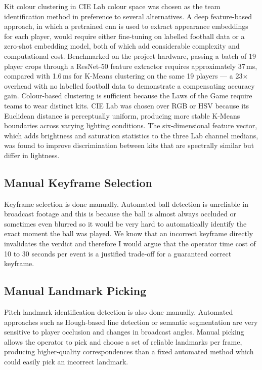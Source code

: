 Kit colour clustering in CIE Lab colour space was chosen as the team identification method in preference to several alternatives. A deep feature-based approach, in which a pretrained \gls{cnn} is used to extract appearance embeddings for each player, would require either fine-tuning on labelled football data or a zero-shot embedding model, both of which add considerable complexity and computational cost. Benchmarked on the project hardware, passing a batch of 19 player crops through a ResNet-50 feature extractor requires approximately 37\,ms, compared with 1.6\,ms for K-Means clustering on the same 19 players — a 23$\times$ overhead with no labelled football data to demonstrate a compensating accuracy gain. Colour-based clustering is sufficient because the Laws of the Game require teams to wear distinct kits. CIE Lab was chosen over RGB or HSV because its Euclidean distance is perceptually uniform, producing more stable K-Means boundaries across varying lighting conditions. The six-dimensional feature vector, which adds brightness and saturation statistics to the three Lab channel medians, was found to improve discrimination between kits that are spectrally similar but differ in lightness.

\subsection{Manual Keyframe Selection}%
\label{sec:design_kf_choice}

Keyframe selection is done manually. Automated ball detection is unreliable in broadcast footage and this is because the ball is almost always occluded or sometimes even blurred so it would be very hard to automatically identify the exact moment the ball was played. We know that an incorrect keyframe directly invalidates the verdict and therefore I would argue that the operator time cost of 10 to 30 seconds per event is a justified trade-off for a guaranteed correct keyframe.

\subsection{Manual Landmark Picking}%
\label{sec:design_landmark_choice}

Pitch landmark identification detection is also done manually. Automated approaches such as Hough-based line detection or semantic segmentation are very sensitive to player occlusion and changes in broadcast angles. Manual picking allows the operator to pick and choose a set of reliable landmarks per frame, producing higher-quality correspondences than a fixed automated method which could easily pick an incorrect landmark.

